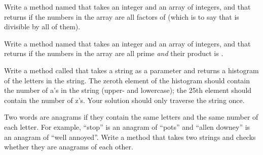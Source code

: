 \begin{exercise}  %

Write a method named  that takes an integer  and an array of integers, and that returns  if the numbers in the array are all factors of  (which is to say that  is divisible by all of them).

\end{exercise}


\begin{exercise}  %

Write a method named  that takes an integer  and an array of integers, and that returns  if the numbers in the array are all prime {\it and} their product is .

\end{exercise}


\begin{exercise}  %

Write a method called  that takes a string as a parameter and returns a histogram of the letters in the string.
The zeroth element of the histogram should contain the number of a's in the string (upper- and lowercase); the 25th element should contain the number of z's.
Your solution should only traverse the string once.

\end{exercise}


\begin{exercise}  %


Two words are anagrams if they contain the same letters and the same number of each letter.
For example, ``stop'' is an anagram of ``pots'' and ``allen downey'' is an anagram of ``well annoyed''.
Write a method that takes two strings and checks whether they are anagrams of each other.

\end{exercise}
